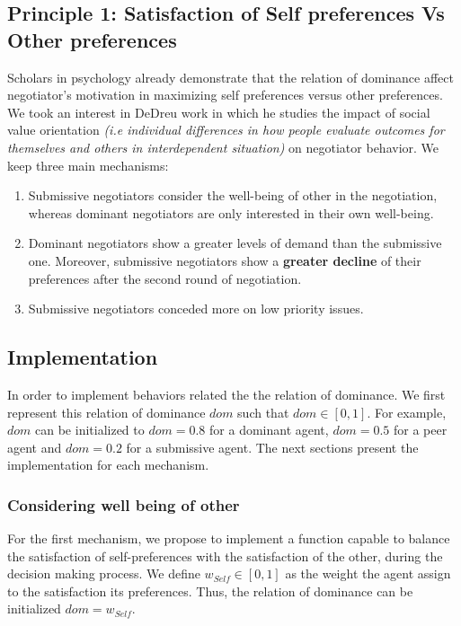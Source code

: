 \documentclass{article}
\begin{document}
	\subsection{Principle 1: Satisfaction of Self preferences Vs Other preferences}
	Scholars in psychology already demonstrate that the relation of dominance affect negotiator's motivation in maximizing self preferences versus other preferences. We took an interest in DeDreu work in which he studies the impact of social value orientation \textit{(i.e  individual differences in	how people evaluate outcomes for themselves and others	in interdependent situation)} on negotiator behavior. We keep three main mechanisms:
	\begin{enumerate}
		\item Submissive negotiators consider the well-being of other in the negotiation, whereas dominant negotiators are only interested in their own well-being.
		\item Dominant negotiators show a greater levels of demand than the submissive one. Moreover, submissive negotiators show a \textbf{greater decline} of their preferences after the second round of negotiation. 
		\item Submissive negotiators conceded more on low priority issues.
	\end{enumerate}   
	
	
	\subsection{Implementation}
	In order to implement behaviors related the the relation of dominance. We first represent this relation of dominance $dom$ such that $dom \in [0, 1]$. For example, $dom$ can be initialized 
	to $dom =0.8$ for a dominant agent, $dom =0.5$ for a peer agent and $dom =0.2$ for a submissive agent.
	The next sections present the implementation for each mechanism.
	
	\subsubsection{Considering well being of other}
	
	For the first mechanism, we propose to implement a function capable to balance the satisfaction of self-preferences with the satisfaction of the other, during the decision making process.
	We define $w_{Self} \in [0, 1]$ as the weight the agent assign to the satisfaction its preferences. Thus, the relation of dominance can be initialized $dom = w_{Self}$.
	
\end{document}

